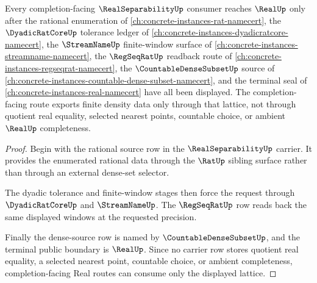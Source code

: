 \begin{theorem}
\label{thm:real-separability-completion-facing-display-route}
Every completion-facing $\RealSeparabilityUp$ consumer reaches $\RealUp$ only after the rational enumeration of \autoref{ch:concrete-instances-rat-namecert}, the $\DyadicRatCoreUp$ tolerance ledger of \autoref{ch:concrete-instances-dyadicratcore-namecert}, the $\StreamNameUp$ finite-window surface of \autoref{ch:concrete-instances-streamname-namecert}, the $\RegSeqRatUp$ readback route of \autoref{ch:concrete-instances-regseqrat-namecert}, the $\CountableDenseSubsetUp$ source of \autoref{ch:concrete-instances-countable-dense-subset-namecert}, and the terminal seal of \autoref{ch:concrete-instances-real-namecert} have all been displayed. The completion-facing route exports finite density data only through that lattice, not through quotient real equality, selected nearest points, countable choice, or ambient $\RealUp$ completeness.
\end{theorem}
\begin{proof}
Begin with the rational source row in the $\RealSeparabilityUp$ carrier. It provides the enumerated rational data through the $\RatUp$ sibling surface rather than through an external dense-set selector.

The dyadic tolerance and finite-window stages then force the request through $\DyadicRatCoreUp$ and $\StreamNameUp$. The $\RegSeqRatUp$ row reads back the same displayed windows at the requested precision.

Finally the dense-source row is named by $\CountableDenseSubsetUp$, and the terminal public boundary is $\RealUp$. Since no carrier row stores quotient real equality, a selected nearest point, countable choice, or ambient completeness, completion-facing Real routes can consume only the displayed lattice.
\end{proof}
